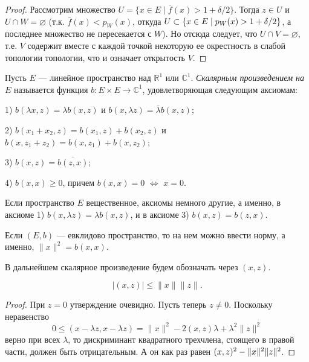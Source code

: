 \documentclass[12pt,titlepage, a4paper]{article}
\begin{document}
\begin{proof}
Рассмотрим множество $U=\{x\in E\mid \bar{f}(x)>1+\delta/2\}$. Тогда
$z\in U$ и $U\cap W=\varnothing$ (т.к. $\bar{f}(x)<p_W(x)$, откуда
$U\subset \{x\in E\mid p_W(x)>1\p+\delta/2\}$, а последнее множество
не пересекается с $W$). Но отсюда следует, что $U\cap
V=\varnothing$, т.е. $V$ содержит вместе с каждой точкой некоторую
ее окрестность в слабой топологии топологии, что и означает
открытость $V$.
\end{proof}
\lecture

\vspace{-25pt}


\begin{defen}
Пусть $E$ --- линейное пространство над $\mathbb{R}^1$ или
$\mathbb{C}^1$. \emph{Скалярным произведением на $E$} называется
функция $b\colon E\times E\to\mathbb{C}^1$, удовлетворяющая
следующим аксиомам:

1) $b(\lambda x,z)=\lambda b(x,z)$ и $b(x,\lambda z)=\bar{\lambda}
b(x,z)$;

2) $b(x_1+x_2,z)=b(x_1,z)+b(x_2,z)$ и
$b(x,z_1+z_2)=b(x,z_1)+b(x,z_2)$;

3) $b(x,z)=\overline{b(z,x)}$;

4) $b(x,x)\geqslant 0$, причем $b(x,x)=0$ $\Leftrightarrow$ $x=0$.

Если пространство $E$ вещественное, аксиомы немного другие, а
именно, в аксиоме 1) $b(x,\lambda z)=\lambda b(x,z)$, и в аксиоме 3)
$b(x,z)=b(z,x)$.
\end{defen}

Если $(E,b)$ --- евклидово пространство, то на нем можно ввести
норму, а именно, $\|x\|^2=b(x,x)$.

В дальнейшем скалярное произведение будем обозначать через $(x,z)$.

\begin{predl}
$$|(x,z)|\leqslant \|x\|\|z\|.$$
\end{predl}

\begin{proof}
При $z=0$ утверждение очевидно. Пусть теперь $z\neq 0$. Поскольку
неравенство
$$0\leqslant(x-\lambda z,x-\lambda z)=\|x\|^2-2(x,z)\lambda
+\lambda^2\|z\|^2$$ верно при всех $\lambda$, то дискриминант
квадратного трехчлена, стоящего в правой части, должен быть
отрицательным. А он как раз равен $(x,z)^2\p-\|x\|^2\|z\|^2$.
\end{proof}
\end{document}

